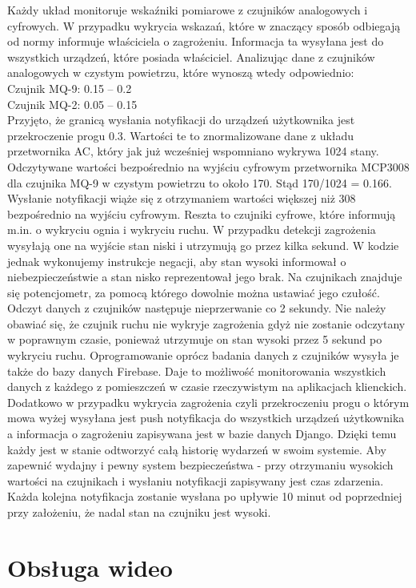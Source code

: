 Każdy układ monitoruje wskaźniki pomiarowe z czujników analogowych i cyfrowych. W przypadku wykrycia wskazań, które w znaczący sposób odbiegają od normy informuje właściciela o zagrożeniu. Informacja ta wysyłana jest do wszystkich urządzeń, które posiada właściciel.  Analizując dane z czujników analogowych w czystym powietrzu, które wynoszą wtedy odpowiednio:\\
Czujnik MQ-9: 0.15 – 0.2\\
Czujnik MQ-2: 0.05 – 0.15\\
Przyjęto, że granicą wysłania notyfikacji do urządzeń użytkownika jest przekroczenie progu 0.3. Wartości te to znormalizowane dane z układu przetwornika AC, który jak już wcześniej wspomniano wykrywa 1024 stany. Odczytywane wartości bezpośrednio na wyjściu cyfrowym przetwornika MCP3008 dla czujnika MQ-9 w czystym powietrzu to około 170. Stąd 170/1024 = 0.166. Wysłanie notyfikacji wiąże się z otrzymaniem wartości większej niż 308 bezpośrednio na wyjściu cyfrowym.
Reszta to czujniki cyfrowe, które informują m.in. o wykryciu ognia i wykryciu ruchu. W przypadku detekcji zagrożenia wysyłają one na wyjście stan niski i utrzymują go przez kilka sekund. W kodzie jednak wykonujemy instrukcje negacji, aby stan wysoki informował o niebezpieczeństwie a stan nisko reprezentował jego brak. Na czujnikach znajduje się potencjometr, za pomocą którego dowolnie można ustawiać jego czułość.
Odczyt danych z czujników następuje nieprzerwanie co 2 sekundy. Nie należy obawiać się, że czujnik ruchu nie wykryje zagrożenia gdyż nie zostanie odczytany w poprawnym czasie, ponieważ utrzymuje on stan wysoki przez 5 sekund po wykryciu ruchu.
Oprogramowanie oprócz badania danych z czujników wysyła je także do bazy danych Firebase. Daje to możliwość monitorowania wszystkich danych z każdego z pomieszczeń w czasie rzeczywistym na aplikacjach klienckich. Dodatkowo w przypadku wykrycia zagrożenia czyli przekroczeniu progu o którym mowa wyżej wysyłana jest push notyfikacja do wszystkich urządzeń użytkownika a informacja o zagrożeniu zapisywana jest w bazie danych Django. Dzięki temu każdy jest w stanie odtworzyć całą historię wydarzeń w swoim systemie.
Aby zapewnić wydajny i pewny system bezpieczeństwa - przy otrzymaniu wysokich wartości na czujnikach i wysłaniu notyfikacji zapisywany jest czas zdarzenia. Każda kolejna notyfikacja zostanie wysłana po upływie 10 minut od poprzedniej przy założeniu, że nadal stan na czujniku jest wysoki. 


\section*{Obsługa wideo}


